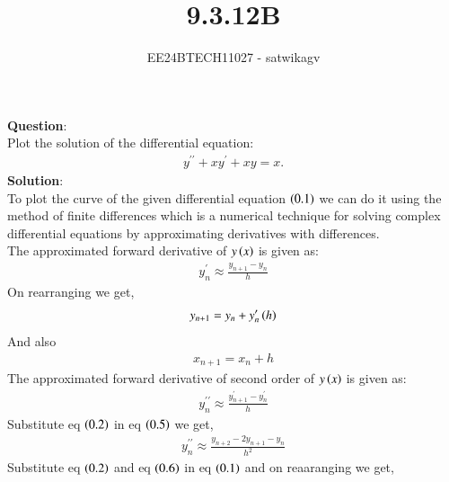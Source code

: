 \documentclass[journal]{IEEEtran}
\begin{document}

\vspace{3cm}

\title{9.3.12B}
\author{EE24BTECH11027 - satwikagv}
{\let\newpage\relax\maketitle}

\renewcommand{\thefigure}{\theenumi}
\renewcommand{\thetable}{\theenumi}
\setlength{\intextsep}{10pt} %


\renewcommand{\thetable}{\theenumi}
\textbf{Question}:\\
Plot the solution of the differential equation: 
\begin{align}
    y^{\prime\prime} +xy^\prime + xy = x. 
\end{align}
\textbf{Solution}:\\
To plot the curve of the given differential equation $\left(0.1\right)$ we can do it using the method of finite differences which is a numerical technique for solving complex differential equations by approximating derivatives with differences.\\
The approximated forward derivative of $y\left(x\right)$ is given as:\\
\begin{align}
    y^\prime_n\approx\frac{y_{n+1}-y_n}{h}
\end{align}
On rearranging we get,
\begin{align}
    y_{n+1}=y_n+y^\prime_n\left(h\right)
\end{align}
And also 
\begin{align}
    x_{n+1}=x_n+h
\end{align}
The approximated forward derivative of second order of $y\left(x\right)$ is given as:\\
\begin{align}
    y^{\prime\prime}_n\approx \frac{y^\prime_{n+1}-y^\prime_n}{h}
\end{align}
Substitute eq $\left(0.2\right)$ in eq $\left(0.5\right)$ we get,
\begin{align}
    y^{\prime\prime}_n\approx\frac{y_{n+2}-2y_{n+1}-y_n}{h^2}
\end{align}
Substitute  eq $\left(0.2\right)$ and eq $\left(0.6\right)$ in eq $\left(0.1\right)$ and on reaaranging we get,
\end{document}
